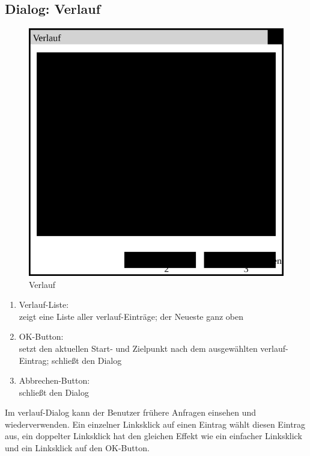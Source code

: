 \documentclass[a4paper, 11pt]{article}
\begin{document}
\subsection{Dialog: Verlauf}
\begin{figure}[H]
\centering
\includegraphics[width=0.7\linewidth]{Verlauf}
\caption{Verlauf}
\label{fig:mockupverlauf}
\end{figure}
\begin{enumerate}
\item Verlauf-Liste:\\
zeigt eine Liste aller \gls{verlauf}-Einträge; der Neueste ganz oben
\item OK-Button:\\
setzt den aktuellen Start- und Zielpunkt nach dem ausgewählten \gls{verlauf}-Eintrag; schließt den Dialog
\item Abbrechen-Button:\\
schließt den Dialog
\end{enumerate}

Im \gls{verlauf}-Dialog kann der Benutzer frühere Anfragen einsehen und wiederverwenden. Ein einzelner Linksklick auf einen Eintrag wählt diesen Eintrag aus, ein doppelter Linksklick hat den gleichen Effekt wie ein einfacher Linksklick und ein Linksklick auf den OK-Button.
\end{document}
